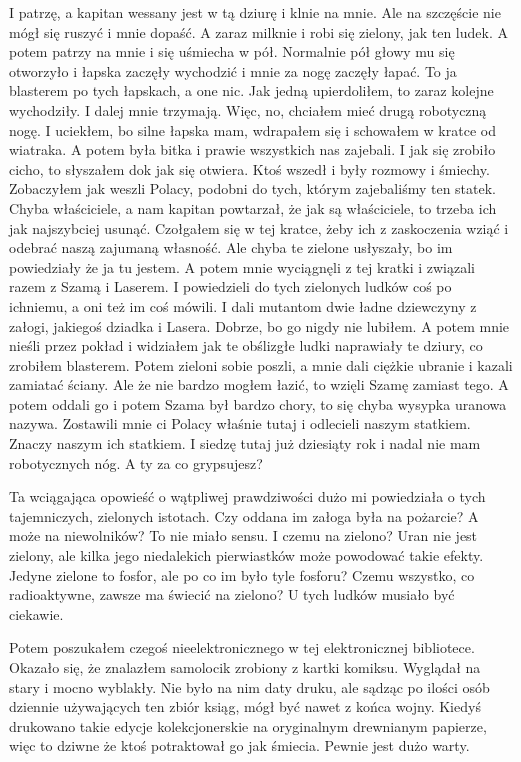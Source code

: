 \begin{poem}
	I patrzę, a kapitan wessany jest w tą dziurę i klnie na mnie. Ale na szczęście nie mógł się ruszyć i mnie dopaść.
	A zaraz milknie i robi się zielony, jak ten ludek.
	A potem patrzy na mnie i się uśmiecha w pół. Normalnie pół głowy mu się otworzyło i łapska zaczęły wychodzić i mnie za nogę zaczęły łapać. 
	To ja blasterem po tych łapskach, a one nic. Jak jedną upierdoliłem, to zaraz kolejne wychodziły. I dalej mnie trzymają.
	Więc, no, chciałem mieć drugą robotyczną nogę.
	I uciekłem, bo silne łapska mam, wdrapałem się i schowałem w kratce od wiatraka.
	A potem była bitka i prawie wszystkich nas zajebali.
	I jak się zrobiło cicho, to słyszałem dok jak się otwiera.
	Ktoś wszedł i były rozmowy i śmiechy.
	Zobaczyłem jak weszli Polacy, podobni do tych, którym zajebaliśmy ten statek. Chyba właściciele, a nam kapitan powtarzał, że jak są właściciele, to trzeba ich jak najszybciej usunąć.
	Czołgałem się w tej kratce, żeby ich z zaskoczenia wziąć i odebrać naszą zajumaną własność.
	Ale chyba te zielone usłyszały, bo im powiedziały że ja tu jestem.
	A potem mnie wyciągnęli z tej kratki i związali razem z Szamą i Laserem.
	I powiedzieli do tych zielonych ludków coś po ichniemu, a oni też im coś mówili. I dali mutantom dwie ładne dziewczyny z załogi, jakiegoś dziadka i Lasera.
	Dobrze, bo go nigdy nie lubiłem.
	A potem mnie nieśli przez pokład i widziałem jak te obślizgłe ludki naprawiały te dziury, co zrobiłem blasterem.
	Potem zieloni sobie poszli, a mnie dali ciężkie ubranie i kazali zamiatać ściany. Ale że nie bardzo mogłem łazić, to wzięli Szamę zamiast tego.
	A potem oddali go i potem Szama był bardzo chory, to się chyba wysypka uranowa nazywa.
	Zostawili mnie ci Polacy właśnie tutaj i odlecieli naszym statkiem. Znaczy naszym ich statkiem.
	I siedzę tutaj już dziesiąty rok i nadal nie mam robotycznych nóg. A ty za co grypsujesz?
\end{poem}

Ta wciągająca opowieść o wątpliwej prawdziwości dużo mi powiedziała o tych tajemniczych, zielonych istotach.
Czy oddana im załoga była na pożarcie? A może na niewolników? To nie miało sensu.
I czemu na zielono? Uran nie jest zielony, ale kilka jego niedalekich pierwiastków może powodować takie efekty.
Jedyne zielone to fosfor, ale po co im było tyle fosforu? Czemu wszystko, co radioaktywne, zawsze ma świecić na zielono?
U tych ludków musiało być ciekawie.

Potem poszukałem czegoś nieelektronicznego w tej elektronicznej bibliotece.
Okazało się, że znalazłem samolocik zrobiony z kartki komiksu.
Wyglądał na stary i mocno wyblakły. Nie było na nim daty druku, ale sądząc po ilości osób dziennie używających ten zbiór ksiąg, mógł być nawet z końca wojny.
Kiedyś drukowano takie edycje kolekcjonerskie na oryginalnym drewnianym papierze, więc to dziwne że ktoś potraktował go jak śmiecia.
Pewnie jest dużo warty.

